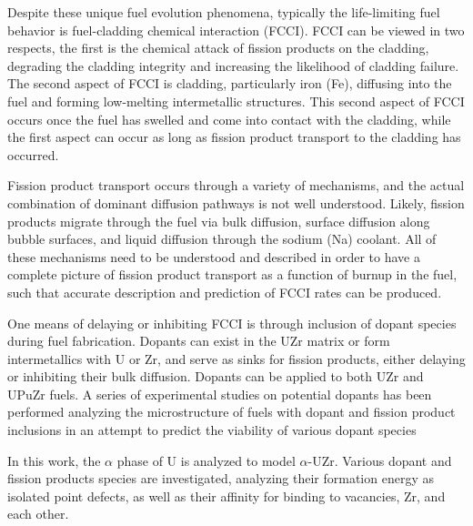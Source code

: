 \documentclass[review]{elsarticle}
\begin{document}
Despite these unique fuel evolution phenomena, typically the life-limiting fuel behavior is fuel-cladding chemical interaction (FCCI). FCCI can be viewed in two respects, the first is the chemical attack of fission products on the cladding, degrading the cladding integrity and increasing the likelihood of cladding failure. The second aspect of FCCI is cladding, particularly iron (Fe), diffusing into the fuel and forming low-melting intermetallic structures. This second aspect of FCCI occurs once the fuel has swelled and come into contact with the cladding, while the first aspect can occur as long as fission product transport to the cladding has occurred. 

Fission product transport occurs through a variety of mechanisms, and the actual combination of dominant diffusion pathways is not well understood. Likely, fission products migrate through the fuel via bulk diffusion, surface diffusion along bubble surfaces, and liquid diffusion through the sodium (Na) coolant. All of these mechanisms need to be understood and described in order to have a complete picture of fission product transport as a function of burnup in the fuel, such that accurate description and prediction of FCCI rates can be produced. 

One means of delaying or inhibiting FCCI is through inclusion of dopant species during fuel fabrication. Dopants can exist in the UZr matrix or form intermetallics with U or Zr, and serve as sinks for fission products, either delaying or inhibiting their bulk diffusion. Dopants can be applied to both UZr and UPuZr fuels. A series of experimental studies on potential dopants has been performed analyzing the microstructure of fuels with dopant and fission product inclusions in an attempt to predict the viability of various dopant species \cite{all of benson papers}

In this work, the $\alpha$ phase of U is analyzed to model $\alpha$-UZr. Various dopant and fission products species are investigated, analyzing their formation energy as isolated point defects, as well as their affinity for binding to vacancies, Zr, and each other.
\end{document}
